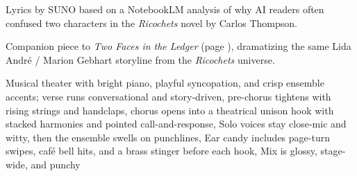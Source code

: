 
\label{sec:two-women-one-case}
\begin{notes}
Lyrics by SUNO based on a NotebookLM analysis of why AI readers often confused two characters in the \emph{Ricochets} novel by Carlos Thompson.

Companion piece to \emph{Two Faces in the Ledger} (page \pageref{sec:two-faces-in-the-ledger}), dramatizing the same Lida André / Marion Gebhart storyline from the \emph{Ricochets} universe.
\end{notes}
\begin{style}
Musical theater with bright piano, playful syncopation, and crisp ensemble accents; verse runs conversational and story-driven, pre-chorus tightens with rising strings and handclaps, chorus opens into a theatrical unison hook with stacked harmonies and pointed call-and-response, Solo voices stay close-mic and witty, then the ensemble swells on punchlines, Ear candy includes page-turn swipes, café bell hits, and a brass stinger before each hook, Mix is glossy, stage-wide, and punchy
\end{style}
